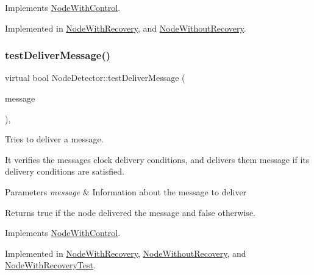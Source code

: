 Implements \hyperlink{class_node_with_control_af532082fab76c38d8c50ca90e991f4c3}{Node\+With\+Control}.



Implemented in \hyperlink{class_node_with_recovery_a216c29d76ddb0e94cd5701ff208c7f5b}{Node\+With\+Recovery}, and \hyperlink{class_node_without_recovery_a0b44132b4ebc650399711766cb050399}{Node\+Without\+Recovery}.

\mbox{\label{class_node_detector_a51e7dccd54e94bbe937752ca39dfdba4}} 
\subsubsection{\texorpdfstring{test\+Deliver\+Message()}{testDeliverMessage()}}
{\footnotesize\ttfamily virtual bool Node\+Detector\+::test\+Deliver\+Message (\begin{DoxyParamCaption}\item[{const \hyperlink{structures_8h_a7e7bdc1d2fff8a9436f2f352b2711ed6}{message\+Info} \&}]{message }\end{DoxyParamCaption})\hspace{0.3cm}{\ttfamily [protected]}, {}}



Tries to deliver a message. 

It verifies the message\textquotesingle{}s clock delivery conditions, and delivers them message if its delivery conditions are satisfied. 
\begin{DoxyParams}{Parameters}
{\em message} & Information about the message to deliver \\
\hline
\end{DoxyParams}
\begin{DoxyReturn}{Returns}
true if the node delivered the message and false otherwise. 
\end{DoxyReturn}


Implements \hyperlink{class_node_with_control_a84df0beabbaed80e7da017d592480515}{Node\+With\+Control}.



Implemented in \hyperlink{class_node_with_recovery_aec147b3723b3dab00f9610453ba8daba}{Node\+With\+Recovery}, \hyperlink{class_node_without_recovery_a8cf83ec6d0af26e385dcde0bc03f5b6d}{Node\+Without\+Recovery}, and \hyperlink{class_node_with_recovery_test_af9b78d0ed4fefb97e2f54c9279aa4655}{Node\+With\+Recovery\+Test}.



